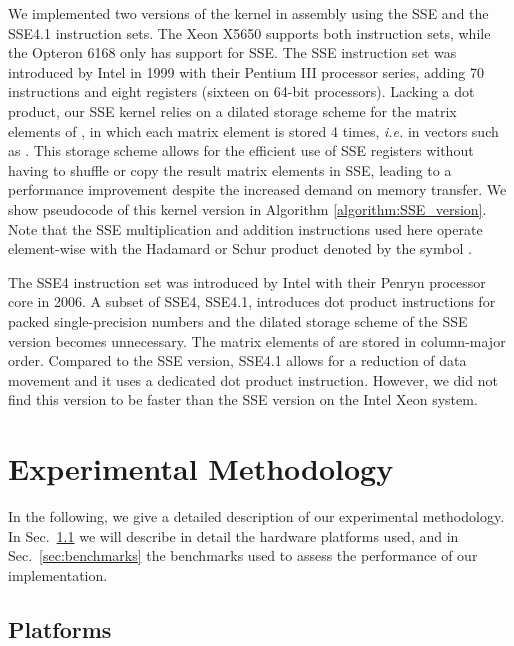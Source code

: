 We implemented two versions of the kernel in assembly using the SSE and the
SSE4.1 instruction sets. The Xeon X5650 supports both instruction sets, while
the Opteron 6168 only has support for SSE.  The SSE instruction set was
introduced by Intel in 1999 with their Pentium III processor series, adding 70
instructions and eight registers (sixteen on 64-bit processors).  Lacking a
dot product, our SSE kernel relies on a dilated storage scheme for the matrix
elements of , in which each matrix element is stored 4 times, {\it i.e.} in
vectors such as . This storage
scheme allows for the efficient use of SSE registers without having to shuffle
or copy the result matrix elements in SSE, leading to a performance
improvement despite the increased demand on memory transfer.  We show
pseudocode of this kernel version in Algorithm \ref{algorithm:SSE_version}.
Note that the SSE multiplication and addition instructions used here operate
element-wise with the Hadamard or Schur product denoted by the symbol .

The SSE4 instruction set was introduced by Intel with their Penryn processor
core in 2006. A subset of SSE4, SSE4.1, introduces dot product instructions for
packed single-precision numbers and the dilated storage scheme of the SSE
version becomes unnecessary. The matrix elements of  are stored in
column-major order.  Compared to the SSE version, SSE4.1 allows for a
reduction of data movement and it uses a dedicated dot product instruction.
However, we did not find this version to be faster than the SSE version on the
Intel Xeon system.

\section{Experimental Methodology}
\label{sec:methodology}

In the following, we give a detailed description of our experimental
methodology. In Sec.~\ref{sec:platforms} we will describe in detail the
hardware platforms used, and in Sec.~\ref{sec:benchmarks} the benchmarks used
to assess the performance of our implementation.

\subsection{Platforms}
\label{sec:platforms}

